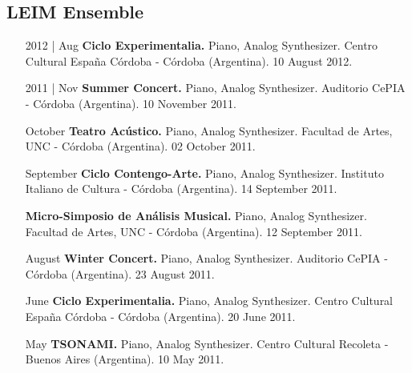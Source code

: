 \documentclass[12pt]{article}%
\begin{document}
\subsection{LEIM Ensemble}%
\begin{itemize}[align=parleft,leftmargin=2.25cm,labelwidth=2cm]
\item[2012 | Aug]
\textbf{Ciclo Experimentalia.}
Piano, Analog Synthesizer. 
Centro Cultural España Córdoba {-} Córdoba (Argentina). 
10 August 2012.
\end{itemize}%
\begin{itemize}[align=parleft,leftmargin=2.25cm,labelwidth=2cm]
\item[2011 | Nov]
\textbf{Summer Concert.}
Piano, Analog Synthesizer. 
Auditorio CePIA {-} Córdoba (Argentina). 
10 November 2011.
\end{itemize}%
\begin{itemize}[align=parleft,leftmargin=2.25cm,labelwidth=2cm]
\item[October]
\textbf{Teatro Acústico.}
Piano, Analog Synthesizer. 
Facultad de Artes, UNC {-} Córdoba (Argentina). 
02 October 2011.
\end{itemize}%
\begin{itemize}[align=parleft,leftmargin=2.25cm,labelwidth=2cm]
\item[September]
\textbf{Ciclo Contengo{-}Arte.}
Piano, Analog Synthesizer. 
Instituto Italiano de Cultura {-} Córdoba (Argentina). 
14 September 2011.
\end{itemize}%
\begin{itemize}[align=parleft,leftmargin=2.25cm,labelwidth=2cm]
\item[]
\textbf{Micro{-}Simposio de Análisis Musical.}
Piano, Analog Synthesizer. 
Facultad de Artes, UNC {-} Córdoba (Argentina). 
12 September 2011.
\end{itemize}%
\begin{itemize}[align=parleft,leftmargin=2.25cm,labelwidth=2cm]
\item[August]
\textbf{Winter Concert.}
Piano, Analog Synthesizer. 
Auditorio CePIA {-} Córdoba (Argentina). 
23 August 2011.
\end{itemize}%
\begin{itemize}[align=parleft,leftmargin=2.25cm,labelwidth=2cm]
\item[June]
\textbf{Ciclo Experimentalia.}
Piano, Analog Synthesizer. 
Centro Cultural España Córdoba {-} Córdoba (Argentina). 
20 June 2011.
\end{itemize}%
\begin{itemize}[align=parleft,leftmargin=2.25cm,labelwidth=2cm]
\item[May]
\textbf{TSONAMI.}
Piano, Analog Synthesizer. 
Centro Cultural Recoleta {-} Buenos Aires (Argentina). 
10 May 2011.
\end{itemize}%
\end{document}
